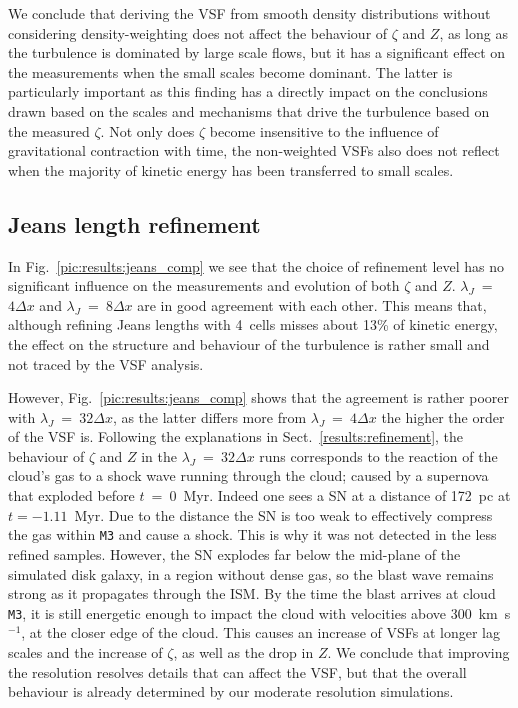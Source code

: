 \documentclass{aa}		%
\begin{document}
We conclude that deriving the VSF from smooth density distributions without considering density-weighting does not affect the behaviour of $\zeta$ and $Z$, as long as the turbulence is dominated by large scale flows, but it has a significant effect on the measurements when the small scales become dominant.
The latter is particularly important as this finding has a directly impact on the conclusions drawn based on the scales and mechanisms that drive the turbulence based on the measured $\zeta$.
Not only does $\zeta$ become insensitive to the influence of gravitational contraction with time, the non-weighted VSFs also does not reflect when the majority of kinetic energy has been transferred to small scales. 


\subsection{Jeans length refinement}\label{discussion:refinement}

In Fig.~\ref{pic:results:jeans_comp} we see that the choice of refinement level has no significant influence on the measurements and evolution of both $\zeta$ and $Z$. 
$\lambda_J$~=~$4\Delta{}x$ and $\lambda_J$~=~$8\Delta{}x$ are in good agreement with each other.
This means that, although refining Jeans lengths with 4~cells misses about 13\% of kinetic energy, the effect on the structure and behaviour of the turbulence is rather small and not traced by the VSF analysis.

However, Fig.~\ref{pic:results:jeans_comp} shows that the agreement is rather poorer with $\lambda_J$~=~$32\Delta{}x$, as the latter differs more from $\lambda_J$~=~$4\Delta{}x$ the higher the order of the VSF is.
Following the explanations in Sect.~\ref{results:refinement}, the behaviour of $\zeta$ and $Z$ in the $\lambda_J$~=~$32\Delta{}x$ runs corresponds to the reaction of the cloud's gas to a shock wave running through the cloud; caused by a supernova that exploded before $t$~=~0~Myr. 
Indeed one sees a SN at a distance of 172~pc at $t=-1.11$~Myr. 
Due to the distance the SN is too weak to effectively compress the gas within \texttt{M3} and cause a shock.
This is why it was not detected in the less refined samples.
However, the SN explodes far below the mid-plane of the simulated disk galaxy, in a region without dense gas, so the blast wave remains strong as it propagates through the ISM. 
By the time the blast arrives at cloud \texttt{M3}, it is still energetic enough to impact the cloud with velocities above 300~km~s$^{-1}$, at the closer edge of the cloud. 
This causes an increase of VSFs at longer lag scales and the increase of $\zeta$, as well as the drop in $Z$.
We conclude that improving the resolution resolves details that can affect the VSF, but that the overall behaviour is already determined by our moderate resolution simulations.
\end{document}
